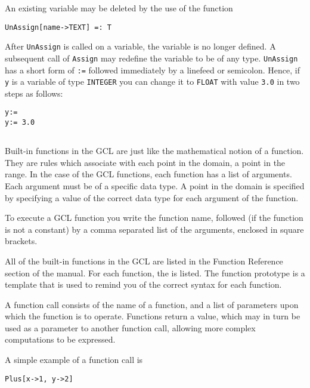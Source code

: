 An existing variable may be deleted by the use of the 
function

\begin{verbatim}
UnAssign[name->TEXT] =: T
\end{verbatim}

\noindent After \verb+UnAssign+ is called on a variable, the variable
is no longer defined.  A subsequent call of {\tt Assign} may redefine
the variable to be of any type.  \verb+UnAssign+ has a short form of
\verb+:=+ followed immediately by a linefeed or semicolon.  Hence, if
\verb+y+ is a variable of type \verb+INTEGER+ you can change it to
\verb+FLOAT+ with value \verb+3.0+ in two steps as follows:

\begin{verbatim}
y:=
y:= 3.0
\end{verbatim}  

\subsection{}

Built-in functions in the GCL are just like the mathematical notion of
a function.  They are rules which associate with each point in the  
domain, a point in the range.  In the case of the GCL functions, each
function has a list of arguments.  Each argument must be of a specific
data type.  A point in the domain is specified by specifying a value
of the correct data type for each argument of the function.  

To execute a GCL function you write the function name, followed
(if the function is not a constant) by a comma separated list of the
arguments, enclosed in square brackets.  

All of the built-in functions in the GCL are listed in the Function
Reference section of the manual.  For each function, the  is listed.  The function prototype is a template that is
used to remind you of the correct syntax for each function.  

A function call consists of the name of a function, and a list of
parameters upon which the function is to operate.  Functions return a
value, which may in turn be used as a parameter to another function
call, allowing more complex computations to be expressed.

A simple example of a function call is

\begin{verbatim}
Plus[x->1, y->2]
\end{verbatim}

